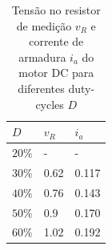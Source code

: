 \documentclass{article}
\begin{document}
\begin{table}[H]
	\centering
	\caption{Tensão no resistor de medição $v_R$ e corrente de armadura $i_a$ do motor DC para diferentes duty-cycles $D$}
	\label{tab:iabuck}
	\begin{tabular}{|l|l|l|}
		\hline
		$D$    & $v_R$ & $i_a$ \\ \hline
		$20\%$ & -     & -     \\ \hline
		$30\%$ & 0.62  & 0.117 \\ \hline
		$40\%$ & 0.76  & 0.143 \\ \hline
		$50\%$ & 0.9   & 0.170 \\ \hline
		$60\%$ & 1.02  & 0.192 \\ \hline
	\end{tabular}
\end{table}
\end{document}
